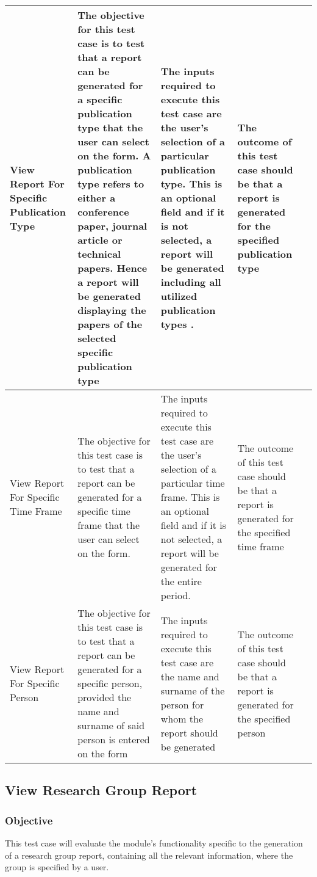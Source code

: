 \begin{tabular}{ L{3cm}| L{3cm}| L{3cm}| L{3cm}| L{0cm}} 
\hline 
View Report For Specific Publication Type &  
The objective for this test case is to test that a report can be generated for a specific publication type that the user can select on the form. A publication type refers to either a conference paper, journal article or technical papers. Hence a report will be generated displaying the papers of the selected specific publication type & 
	The inputs required to execute this test case are the user's selection of a particular publication type. This is an optional field and if it is not selected, a report will be generated including all utilized publication types . & 
	The outcome of this test case should be that a report is generated for the specified publication type& \\ 
\hline 
View Report For Specific Time Frame &  
The objective for this test case is to test that a report can be generated for a specific time frame that the user can select on the form. & 
	The inputs required to execute this test case are the user's selection of a particular time frame. This is an optional field and if it is not selected, a report will be generated for the entire period. & 
	The outcome of this test case should be that a report is generated for the specified time frame& \\ 
\hline
View Report For Specific Person &  
The objective for this test case is to test that a report can be generated for a specific person, provided the name and surname of said person is entered on the form & 
	The inputs required to execute this test case are the name and surname of the person for whom the report should be generated& 
	The outcome of this test case should be that a report is generated for the specified person& \\ 
\hline	 
\end{tabular}

\subsection{View Research Group Report}
\subsubsection{Objective}
This test case will evaluate the module's functionality specific to the generation of a research group report, containing all the relevant information, where the group is specified by a user.

